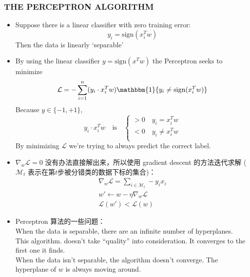 \documentclass{article} 	%
\begin{document}
		\subsubsection{THE PERCEPTRON ALGORITHM}
			\begin{itemize}
			\item
			Suppose there is a linear classifier with zero training error:
			$$y_i = \mathrm{sign}(x_i^Tw)$$
			Then the data is linearly ‘separable’\\
			\item
			By using the linear classifier $y = \mathrm{sign}(x^Tw)$ the Perceptron seeks to minimize
			$$\mathcal{L} = -\sum_{i=1}^n(y_{i}\cdot x_i^Tw)\mathbbm{1} \{y_i\not = \mathrm{sign}(x_i^Tw)\}$$
			Because $y\in \{-1,+1\}$,
			\[
			y_i\cdot x_i^Tw \quad \mathrm{is}\quad
			\left \{ 
			\begin{array}{c}
			> 0\quad y_i = x_i^Tw\\
			< 0\quad y_i \not= x_i^Tw\\
			\end{array}
			\right .
			\]
			By minimizing $\mathcal{L}$ we’re trying to always predict the correct label.
			\item
			$\nabla_w\mathcal{L} = 0 $ 没有办法直接解出来，所以使用 gradient descent 的方法迭代求解
			($\mathcal{M}_t$ 表示在第$t$步被分错类的数据下标的集合)：
			\begin{eqnarray}
			\nabla_w\mathcal{L} = \sum_{i \in \mathcal{M}_t} -y_ix_i\\
			w'\gets w -\eta \nabla_w\mathcal{L} \\
			\mathcal{L}(w')<\mathcal{L}(w)
			\end{eqnarray}
			\item
			Perceptron 算法的一些问题：\\
			When the data is separable, there are an infinite number of hyperplanes.\\
			This algorithm. doesn’t take “quality” into consideration. It converges to the first one it finds.\\
			When the data isn’t separable, the algorithm doesn’t converge. The hyperplane of $w$ is always moving around.\\
			\end{itemize}
			
	
	
			
		
	
\end{document}
